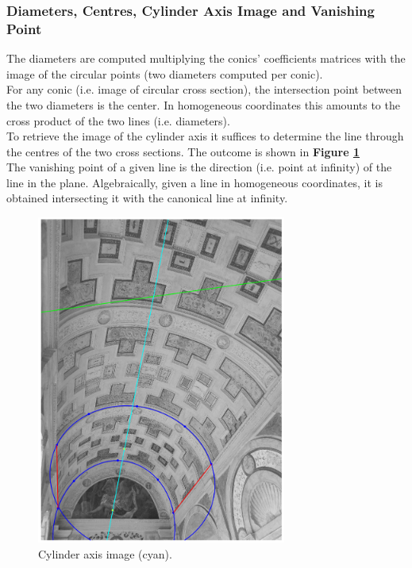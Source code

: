 \documentclass[12pt,a4paper]{article}
\begin{document}
\subsubsection{Diameters, Centres, Cylinder Axis Image and Vanishing Point}\label{sec:toAxisImageVanishingPoint}
The diameters are computed multiplying the conics' coefficients matrices with the image of the circular points (two diameters computed per conic).\\

For any conic (i.e. image of circular cross section), the intersection point between the two diameters is the center. In homogeneous coordinates this amounts to the cross product of the two lines (i.e. diameters).\\

To retrieve the image of the cylinder axis it suffices to determine the line through the centres of the two cross sections. The outcome is shown in \textbf{Figure \ref{fig:axisImage}}\\

The vanishing point of a given line is the direction (i.e. point at infinity) of the line in the plane. Algebraically, given a line in homogeneous coordinates, it is obtained intersecting it with the canonical line at infinity.

\begin{figure}[H]
    \centering
    \includegraphics[width=0.73\textwidth]{Images/PalazzoTe_axis.png}
    \caption[Cylinder Axis Image.]{Cylinder axis image (cyan).}
    \label{fig:axisImage}
\end{figure}
\end{document}
